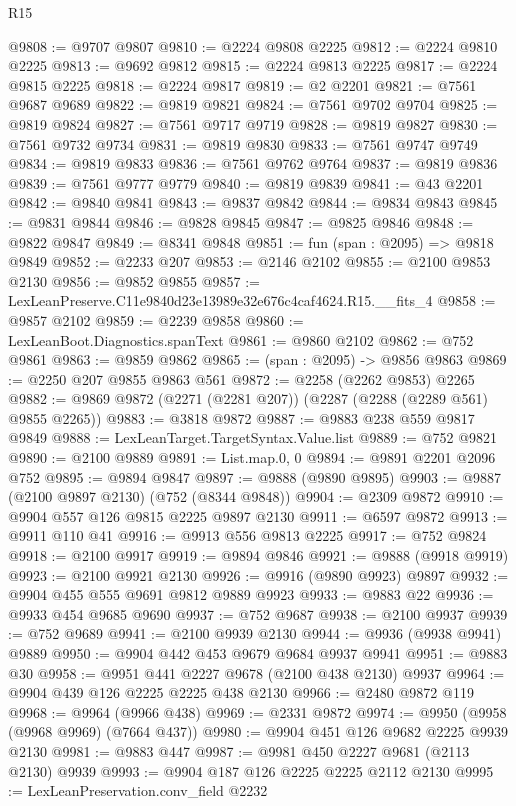 \begin{lexlean}{R15}
\begin{coremodule}
@9808 := @9707 @9807
@9810 := @2224 @9808 @2225
@9812 := @2224 @9810 @2225
@9813 := @9692 @9812
@9815 := @2224 @9813 @2225
@9817 := @2224 @9815 @2225
@9818 := @2224 @9817
@9819 := @2 @2201
@9821 := @7561 @9687 @9689
@9822 := @9819 @9821
@9824 := @7561 @9702 @9704
@9825 := @9819 @9824
@9827 := @7561 @9717 @9719
@9828 := @9819 @9827
@9830 := @7561 @9732 @9734
@9831 := @9819 @9830
@9833 := @7561 @9747 @9749
@9834 := @9819 @9833
@9836 := @7561 @9762 @9764
@9837 := @9819 @9836
@9839 := @7561 @9777 @9779
@9840 := @9819 @9839
@9841 := @43 @2201
@9842 := @9840 @9841
@9843 := @9837 @9842
@9844 := @9834 @9843
@9845 := @9831 @9844
@9846 := @9828 @9845
@9847 := @9825 @9846
@9848 := @9822 @9847
@9849 := @8341 @9848
@9851 := fun (span : @2095) => @9818 @9849
@9852 := @2233 @207
@9853 := @2146 @2102
@9855 := @2100 @9853 @2130
@9856 := @9852 @9855
@9857 := LexLeanPreserve.C11e9840d23e13989e32e676c4caf4624.R15.__fits_4
@9858 := @9857 @2102
@9859 := @2239 @9858
@9860 := LexLeanBoot.Diagnostics.spanText
@9861 := @9860 @2102
@9862 := @752 @9861
@9863 := @9859 @9862
@9865 := (span : @2095) -> @9856 @9863
@9869 := @2250 @207 @9855 @9863 @561
@9872 := @2258 (@2262 @9853) @2265
@9882 := @9869 @9872 (@2271 (@2281 @207)) (@2287 (@2288 (@2289 @561) @9855 @2265))
@9883 := @3818 @9872
@9887 := @9883 @238 @559 @9817 @9849
@9888 := LexLeanTarget.TargetSyntax.Value.list
@9889 := @752 @9821
@9890 := @2100 @9889
@9891 := List.map.{0, 0}
@9894 := @9891 @2201 @2096 @752
@9895 := @9894 @9847
@9897 := @9888 (@9890 @9895)
@9903 := @9887 (@2100 @9897 @2130) (@752 (@8344 @9848))
@9904 := @2309 @9872
@9910 := @9904 @557 @126 @9815 @2225 @9897 @2130
@9911 := @6597 @9872
@9913 := @9911 @110 @41
@9916 := @9913 @556 @9813 @2225
@9917 := @752 @9824
@9918 := @2100 @9917
@9919 := @9894 @9846
@9921 := @9888 (@9918 @9919)
@9923 := @2100 @9921 @2130
@9926 := @9916 (@9890 @9923) @9897
@9932 := @9904 @455 @555 @9691 @9812 @9889 @9923
@9933 := @9883 @22
@9936 := @9933 @454 @9685 @9690
@9937 := @752 @9687
@9938 := @2100 @9937
@9939 := @752 @9689
@9941 := @2100 @9939 @2130
@9944 := @9936 (@9938 @9941) @9889
@9950 := @9904 @442 @453 @9679 @9684 @9937 @9941
@9951 := @9883 @30
@9958 := @9951 @441 @2227 @9678 (@2100 @438 @2130) @9937
@9964 := @9904 @439 @126 @2225 @2225 @438 @2130
@9966 := @2480 @9872 @119
@9968 := @9964 (@9966 @438)
@9969 := @2331 @9872
@9974 := @9950 (@9958 (@9968 @9969) (@7664 @437))
@9980 := @9904 @451 @126 @9682 @2225 @9939 @2130
@9981 := @9883 @447
@9987 := @9981 @450 @2227 @9681 (@2113 @2130) @9939
@9993 := @9904 @187 @126 @2225 @2225 @2112 @2130
@9995 := LexLeanPreservation.conv_field @2232

\end{coremodule}
\end{lexlean}
